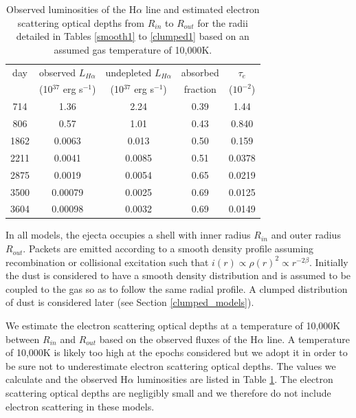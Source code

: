 \documentclass[useAMS,usenatbib,usegraphicx]{mnras}
\begin{document}
\begin{table}
\caption{Observed luminosities of the H$\alpha$ line and estimated electron scattering optical depths from $R_{in}$ to $R_{out}$ for the radii detailed in Tables \ref{smooth1} to \ref{clumped1} based on an assumed gas temperature of 10,000K.}
\begin{center}
\begin{tabular}{@{}ccccc@{}}
\hline
day & observed $L_{H\alpha}$ & undepleted $L_{H\alpha}$ & absorbed  & $\tau_e$ \\
& (10$^{37}$ erg s$^{-1}$) & (10$^{37}$ erg s$^{-1}$) & fraction & ($10^{-2}$) \\
\hline
714 & 1.36 & 2.24 &0.39& 1.44  \\
806 & 0.57 & 1.01 &0.43& 0.840 \\
1862 & 0.0063 & 0.013 &0.50& 0.159  \\
2211 & 0.0041 &0.0085 &0.51& 0.0378  \\
2875 & 0.0019 & 0.0054& 0.65 &0.0219  \\
3500 & 0.00079 & 0.0025 & 0.69&0.0125  \\
3604 & 0.00098 & 0.0032 &0.69&0.0149  \\

\hline
\end{tabular}
\end{center}
\label{tau_e}
\end{table}%



In all models, the ejecta occupies a shell with inner radius $R_{in}$ and 
outer radius $R_{out}$.  Packets are emitted according to a smooth density 
profile assuming recombination or collisional excitation such that $i(r) \propto \rho(r)^2 \propto 
r^{-2\beta}$.  Initially the dust is considered to have a smooth density 
distribution and is assumed to be coupled to the gas so as to follow the same 
radial profile.  A clumped distribution of dust is considered later (see 
Section \ref{clumped_models}).  

We estimate the electron scattering optical depths at a temperature of 10,000K between $R_{in}$ and $R_{out}$ based on the observed fluxes of the H$\alpha$ line.  A temperature of 10,000K is likely too high at the epochs considered but we adopt it in order to be sure not to underestimate electron scattering optical depths.  The values we calculate and the observed H$\alpha$ luminosities are listed in Table \ref{tau_e}.  The  electron scattering optical depths are negligibly small and we therefore do not include electron scattering in 
these models.
\end{document}
